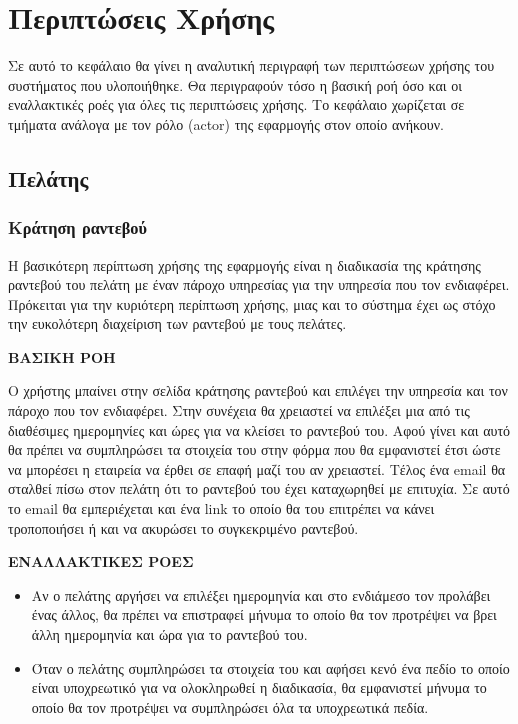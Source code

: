 
\chapter{Περιπτώσεις Χρήσης}
Σε αυτό το κεφάλαιο θα γίνει η αναλυτική περιγραφή των περιπτώσεων χρήσης του συστήματος που υλοποιήθηκε. Θα περιγραφούν τόσο η βασική ροή όσο και οι εναλλακτικές ροές για όλες τις περιπτώσεις χρήσης. Το κεφάλαιο χωρίζεται σε τμήματα ανάλογα με τον ρόλο (actor) της εφαρμογής στον οποίο ανήκουν.

\section{Πελάτης}
\subsection{Κράτηση ραντεβού}
Η βασικότερη περίπτωση χρήσης της εφαρμογής είναι η διαδικασία της κράτησης ραντεβού του πελάτη με έναν πάροχο υπηρεσίας για την υπηρεσία που τον ενδιαφέρει. Πρόκειται για την κυριότερη περίπτωση χρήσης, μιας και το σύστημα έχει ως στόχο την ευκολότερη διαχείριση των ραντεβού με τους πελάτες. 

\textbf{ΒΑΣΙΚΗ ΡΟΗ}

Ο χρήστης μπαίνει στην σελίδα κράτησης ραντεβού και επιλέγει την υπηρεσία και τον πάροχο που τον ενδιαφέρει. Στην συνέχεια θα χρειαστεί να επιλέξει μια από τις διαθέσιμες ημερομηνίες και ώρες για να κλείσει το ραντεβού του. Αφού γίνει και αυτό θα πρέπει να συμπληρώσει τα στοιχεία του στην φόρμα που θα εμφανιστεί έτσι ώστε να μπορέσει η εταιρεία να έρθει σε επαφή μαζί του αν χρειαστεί. Τέλος ένα email θα σταλθεί πίσω στον πελάτη ότι το ραντεβού του έχει καταχωρηθεί με επιτυχία. Σε αυτό το email θα εμπεριέχεται και ένα link το οποίο θα του επιτρέπει να κάνει τροποποιήσει ή και να ακυρώσει το συγκεκριμένο ραντεβού.

\textbf{ΕΝΑΛΛΑΚΤΙΚΕΣ ΡΟΕΣ}

\begin{itemize}
\item Αν ο πελάτης αργήσει να επιλέξει ημερομηνία και στο ενδιάμεσο τον προλάβει ένας άλλος, θα πρέπει να επιστραφεί μήνυμα το οποίο θα τον προτρέψει να βρει άλλη ημερομηνία και ώρα για το ραντεβού του.
\item Όταν ο πελάτης συμπληρώσει τα στοιχεία του και αφήσει κενό ένα πεδίο το οποίο είναι υποχρεωτικό για να ολοκληρωθεί η διαδικασία, θα εμφανιστεί μήνυμα το οποίο θα τον προτρέψει να συμπληρώσει όλα τα υποχρεωτικά πεδία.
\end{itemize}

